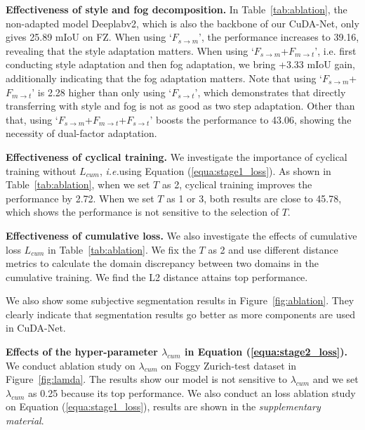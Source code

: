 \documentclass[10pt,twocolumn,letterpaper]{article}
\def\ie{\textit{i.e.}}
\def\model{F}
\def\imd{m}
\def\td{t}
\begin{document}
\noindent\textbf{Effectiveness of style and fog decomposition.} In Table~\ref{tab:ablation}, the non-adapted model Deeplabv2, which is also the backbone of our CuDA-Net, only gives 25.89 mIoU on FZ. When using `$\model_{s \rightarrow \imd}$', the performance increases to 39.16, revealing that the style adaptation matters. When using `$\model_{s \rightarrow \imd}$+$\model_{\imd \rightarrow \td}$', i.e. first conducting style adaptation and then fog adaptation, we bring +3.33 mIoU gain, additionally indicating that the fog adaptation matters.
Note that using `$\model_{s \rightarrow \imd}$+$\model_{\imd \rightarrow \td}$' is 2.28 higher than only using `$\model_{s \rightarrow \td}$', which demonstrates that directly transferring with style and fog is not as good as two step adaptation. Other than that, using `$\model_{s \rightarrow \imd}$+$\model_{\imd \rightarrow \td}$+$\model_{s \rightarrow \td}$' boosts the performance to 43.06, showing the necessity of dual-factor adaptation.

\noindent\textbf{Effectiveness of cyclical training.} We investigate the importance of cyclical training without ${L}_{cum}$, \ie using Equation (\ref{equa:stage1_loss}). As shown in Table~\ref{tab:ablation}, when we set $T$ as 2, cyclical training improves the performance by 2.72. When we set $T$ as 1 or 3, both results are close to 45.78, which shows the performance is not sensitive to the selection of $T$.

\noindent\textbf{Effectiveness of cumulative loss.} We also investigate the effects of cumulative loss ${L}_{cum}$ in Table~\ref{tab:ablation}. We fix the $T$ as 2 and use different distance metrics to calculate the domain discrepancy between two domains in the cumulative training. We find the L2 distance attains top performance.



We also show some subjective segmentation results in Figure~\ref{fig:ablation}. They clearly indicate that segmentation results go better as more components are used in CuDA-Net.

\noindent\textbf{Effects of the hyper-parameter $\lambda_{cum}$ in Equation (\ref{equa:stage2_loss}).} We conduct ablation study on $\lambda_{cum}$ on Foggy Zurich-test dataset in Figure~\ref{fig:lamda}. The results show our model is not sensitive to $\lambda_{cum}$ and we set $\lambda_{cum}$ as 0.25 because its top performance. We also conduct an loss ablation study on Equation (\ref{equa:stage1_loss}), results are shown in the \emph{supplementary material}.
\end{document}
